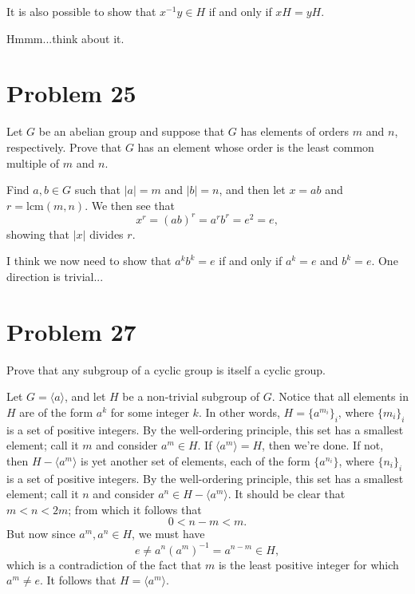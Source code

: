\documentclass[12pt]{article}
\newcommand{\lcm}{\mbox{lcm}}
\begin{document}
It is also possible to show that $x^{-1}y\in H$ if and only if $xH=yH$.

Hmmm...think about it.

\section*{Problem 25}

Let $G$ be an abelian group and suppose that $G$ has elements of orders
$m$ and $n$, respectively.  Prove that $G$ has an element whose order is the
least common multiple of $m$ and $n$.

Find $a,b\in G$ such that $|a|=m$ and $|b|=n$, and then let $x=ab$ and $r=\lcm(m,n)$.
We then see that
\begin{equation*}
x^r = (ab)^r = a^rb^r = e^2 = e,
\end{equation*}
showing that $|x|$ divides $r$.

I think we now need to show that $a^kb^k=e$ if and only if $a^k=e$ and $b^k=e$.
One direction is trivial...

\section*{Problem 27}

Prove that any subgroup of a cyclic group is itself a cyclic group.

Let $G=\langle a\rangle$, and let $H$ be a non-trivial subgroup of $G$.
Notice that all elements in $H$ are of the form $a^k$ for some integer $k$.
In other words, $H=\{a^{m_i}\}_i$, where $\{m_i\}_i$ is a set of positive integers.
By the well-ordering principle, this set has a smallest element; call it $m$ and consider $a^m\in H$.
If $\langle a^m\rangle=H$, then we're done.  If not, then $H-\langle a^m\rangle$ is yet
another set of elements, each of the form $\{a^{n_i}\}$, where $\{n_i\}_i$ is a set of positive integers.
By the well-ordering principle, this set has a smallest element; call it $n$ and consider $a^n\in H-\langle a^m\rangle$.
It should be clear that $m < n < 2m$; from which it follows that
\begin{equation*}
0 < n - m < m.
\end{equation*}
But now since $a^m,a^n\in H$, we must have
\begin{equation*}
e\neq a^n(a^m)^{-1} = a^{n-m}\in H,
\end{equation*}
which is a contradiction of the fact that $m$ is the least positive integer for which $a^m\neq e$.
It follows that $H=\langle a^m\rangle$.
\end{document}
